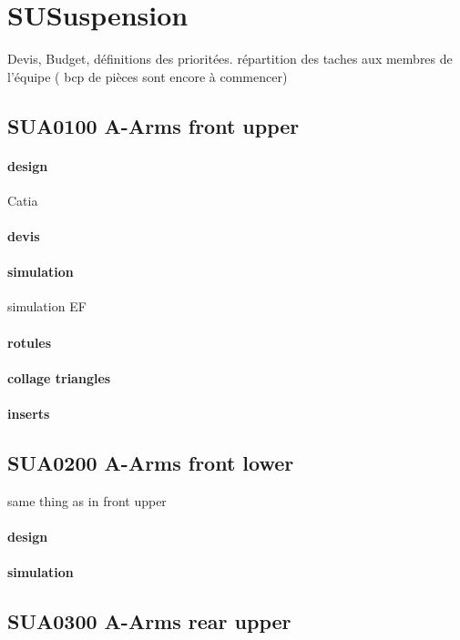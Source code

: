 \newpage 
 \section*{SU\textunderscore Suspension} 
 \par Devis, Budget, définitions des prioritées. répartition des taches aux membres de l'équipe ( bcp de pièces sont encore à commencer)
	\subsection*{SU\textunderscore A0100 A-Arms front upper} 
 \par 
		\paragraph{design} Catia

		\paragraph{devis} 
		\paragraph{simulation} simulation EF
		\paragraph{rotules} 
		\paragraph{collage triangles} 
		\paragraph{inserts} 
	\subsection*{SU\textunderscore A0200 A-Arms front lower} 
 \par same thing as in front upper
		\paragraph{design} 
		\paragraph{simulation} 
	\subsection*{SU\textunderscore A0300 A-Arms rear upper} 
 \par 
